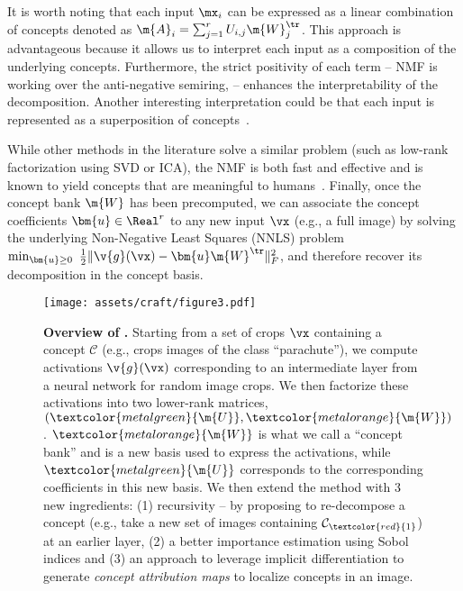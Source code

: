 It is worth noting that each input $\mx_i$ can be expressed as a linear combination of concepts denoted as $\m{A}_i = \sum_{j=1}^r U_{i,j} \m{W}_j^\tr$.  This approach is advantageous because it allows us to interpret each input as a composition of the underlying concepts. Furthermore, the strict positivity of each term -- NMF is working over the anti-negative semiring, -- enhances the interpretability of the decomposition. Another interesting interpretation could be that each input is represented as a superposition of concepts~\cite{elhage2022superposition}.

While other methods in the literature solve a similar problem (such as low-rank factorization using SVD or ICA), the NMF is both fast and effective and is known to yield concepts that are meaningful to humans~\cite{fu2019nonnegative,zhang2021invertible}. Finally, once the concept bank $\m{W}$ has been precomputed, we can associate the concept coefficients $\bm{u} \in \Real^r$ to any new input $\vx$ (e.g., a full image) by solving the underlying Non-Negative Least Squares (NNLS) problem $\min_{\bm{u} \geq 0} ~ \frac{1}{2}\|\v{g}(\vx) - \bm{u}\m{W}^\tr\|^2_{F}$, and therefore recover its decomposition in the concept basis.


\begin{figure*}[t!]
\centering
\centering
\texttt{[image: assets/craft/figure3.pdf]}

\caption{
\textbf{Overview of \craft.}
Starting from a set of crops $\vx$ containing a concept $\mathcal{C}$ (e.g., crops images of the class ``parachute''), we compute activations $\v{g}(\vx)$ corresponding to an intermediate layer from a neural network for random image crops. 
We then factorize these activations into two lower-rank matrices, $(\textcolor{metalgreen}{\m{U}}, \textcolor{metalorange}{\m{W}})$. $\textcolor{metalorange}{\m{W}}$ is what we call a ``concept bank'' and is a new basis used to express the activations, while $\textcolor{metalgreen}{\m{U}}$ corresponds to the corresponding coefficients in this new basis.
We then extend the method with 3 new ingredients: (1) recursivity -- by proposing to re-decompose a concept (e.g., take a new set of images containing $\mathcal{C}_{\textcolor{red}{1}}$) at an earlier layer, (2) a better importance estimation using Sobol indices and (3) an approach to leverage implicit differentiation to generate \textit{concept attribution maps} to localize concepts in an image.
}
\label{fig:craft:craft}
\end{figure*}


